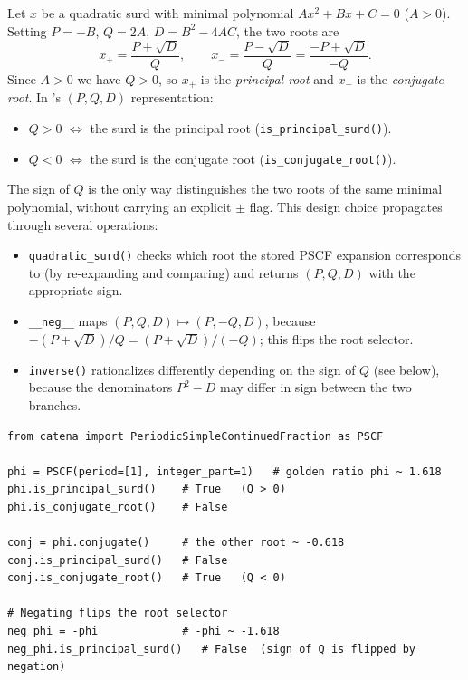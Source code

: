 \begin{definition}
  \label{def:principal-conjugate}
  Let $x$ be a quadratic surd with minimal polynomial $Ax^2 + Bx + C = 0$ ($A > 0$).
  Setting $P = -B$, $Q = 2A$, $D = B^2 - 4AC$, the two roots are
  \[
    x_+ = \frac{P + \sqrt{D}}{Q}, \qquad x_- = \frac{P - \sqrt{D}}{Q} = \frac{-P + \sqrt{D}}{-Q}.
  \]
  Since $A > 0$ we have $Q > 0$, so $x_+$ is the \emph{principal root} and $x_-$ is the
  \emph{conjugate root}.  In \catena's $(P, Q, D)$ representation:
  \begin{itemize}
    \item $Q > 0$ \;\;$\Longleftrightarrow$\;\; the surd is the principal root (\texttt{is\_principal\_surd()}).
    \item $Q < 0$ \;\;$\Longleftrightarrow$\;\; the surd is the conjugate root (\texttt{is\_conjugate\_root()}).
  \end{itemize}
\end{definition}

\begin{remark}
  The sign of $Q$ is the only way \catena distinguishes the two roots of the same minimal
  polynomial, without carrying an explicit $\pm$ flag.  This design choice propagates through
  several operations:
  \begin{itemize}
    \item \texttt{quadratic\_surd()} checks which root the stored PSCF expansion corresponds to
          (by re-expanding and comparing) and returns $(P, Q, D)$ with the appropriate sign.
    \item \texttt{\_\_neg\_\_} maps $(P, Q, D) \mapsto (P, -Q, D)$, because $-(P + \sqrt{D})/Q =
          (P + \sqrt{D})/(-Q)$; this flips the root selector.
    \item \texttt{inverse()} rationalizes differently depending on the sign of $Q$ (see below),
          because the denominators $P^2 - D$ may differ in sign between the two branches.
  \end{itemize}
\end{remark}

\begin{catenadef}
\begin{lstlisting}[style=python]
from catena import PeriodicSimpleContinuedFraction as PSCF

phi = PSCF(period=[1], integer_part=1)   # golden ratio phi ~ 1.618
phi.is_principal_surd()    # True   (Q > 0)
phi.is_conjugate_root()    # False

conj = phi.conjugate()     # the other root ~ -0.618
conj.is_principal_surd()   # False
conj.is_conjugate_root()   # True   (Q < 0)

# Negating flips the root selector
neg_phi = -phi             # -phi ~ -1.618
neg_phi.is_principal_surd()   # False  (sign of Q is flipped by negation)
\end{lstlisting}
\end{catenadef}

